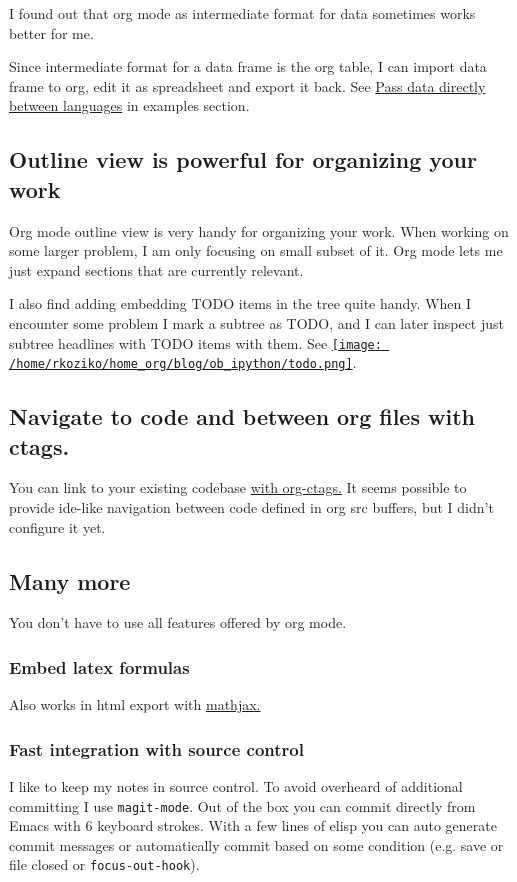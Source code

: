 \documentclass[11pt]{article}
\begin{document}
I found out that org mode as intermediate format for data sometimes works better for me.

Since intermediate format for a data frame is the org table, I can import data frame to org, edit it as spreadsheet and export it back.
See \hyperref[sec:orgheadline10]{Pass data directly between languages} in examples section.
\subsection{Outline view is powerful for organizing your work}
\label{sec:orgheadline12}
Org mode outline view is very handy for organizing your work.
When working on some larger problem, I am only focusing on small subset of it.
Org mode lets me just expand sections that are currently relevant.

I also find adding embedding TODO items in the tree quite handy.
When I encounter some problem I mark a subtree as TODO, and I can
later inspect just subtree headlines with TODO items with them.
See \href{todo.png}{\texttt{[image: /home/rkoziko/home\_org/blog/ob\_ipython/todo.png]}}.
\subsection{Navigate to code and between org files with ctags.}
\label{sec:orgheadline13}
You can link to your existing codebase \href{http://orgmode.org/w/?p=org-mode.git;a=blob_plain;f=lisp/org-ctags.el;hb=HEAD}{with org-ctags.}
It seems possible to provide ide-like navigation between
code defined in org src buffers, but I didn't configure it yet.
\subsection{Many more}
\label{sec:orgheadline27}
You don't have to use all features offered by org mode.
\subsubsection{Embed latex formulas}
\label{sec:orgheadline14}
Also works in html export with \href{https://www.mathjax.org/}{mathjax.}
\subsubsection{Fast integration with source control}
\label{sec:orgheadline15}
I like to keep my notes in source control.
To avoid overheard of additional committing I use \texttt{magit-mode}.
Out of the box you can commit directly from Emacs with 6 keyboard strokes.
With a few lines of elisp you can auto generate commit messages or automatically commit based on some condition (e.g. save or file closed or \texttt{focus-out-hook}).
\end{document}
